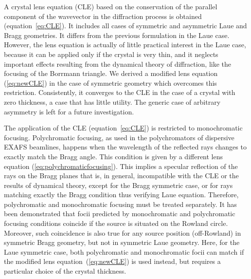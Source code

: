\documentclass[preprint]{iucr}              %
\begin{document}
A crystal lens equation (CLE) based on the conservation of the parallel component of the wavevector in the diffraction process is obtained (equation~\ref{eq:CLE}). It includes all cases of symmetric and asymmetric Laue and Bragg geometries. It differs from the previous formulation \cite{CK} in the Laue case. However, the lens equation is actually of little practical interest in the Laue case, because it can be applied only if the crystal is very thin, and it neglects important effects resulting from the dynamical theory of diffraction, like the focusing of the Borrmann triangle. We derived a modified lens equation (\ref{eq:newCLE}) in the case of symmetric geometry which overcomes this restriction. Consistently, it converges to the CLE in the case of a crystal with zero thickness, a case that has little utility. The generic case of arbitrary asymmetry is left for a future investigation.

The application of the CLE (equation~\ref{eq:CLE}) is restricted to monochromatic focusing. Polychromatic focusing, as used in the polychromators of dispersive EXAFS beamlines, happens when the wavelength of the reflected rays changes to exactly match the Bragg angle. This condition is given by a different lens equation (\ref{eq:polychromaticfocusing}). This implies a specular reflection of the rays on the Bragg planes that is, in general, incompatible with the CLE or the results of dynamical theory, except for the Bragg symmetric case, or for rays matching exactly the Bragg condition thus verifying Laue equation. Therefore, polychromatic and monochromatic focusing must be treated separately. It has been demonstrated that focii predicted by monochromatic and polychromatic focusing conditions coincide if the source is situated on the Rowland circle. Moreover, such coincidence is also true for any source position (off-Rowland) in symmetric Bragg geometry, but not in symmetric Laue geometry. Here, for the Laue symmetric case, both polychromatic and monochromatic focii can match if the modified lens equation~(\ref{eq:newCLE}) is used instead, but requires a particular choice of the crystal thickness.



\end{document}
